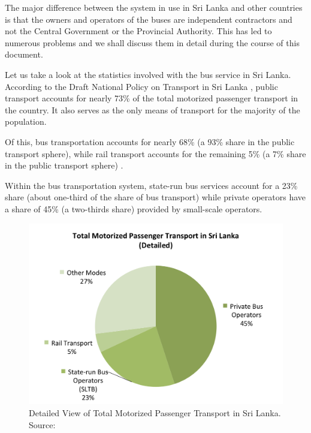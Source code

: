 \documentclass[12pt, oneside]{report}
\begin{document}
The major difference between the system in use in Sri Lanka and other countries is that the owners and operators of the buses are independent contractors and not the Central Government or the Provincial Authority. This has led to numerous problems and we shall discuss them in detail during the course of this document.

Let us take a look at the statistics involved with the bus service in Sri Lanka. According to the Draft National Policy on Transport in Sri Lanka \citep{MinistryofTransport2008}, public transport accounts for nearly 73\% of the total motorized passenger transport in the country. It also serves as the only means of transport for the majority of the population.

Of this, bus transportation accounts for nearly 68\% (a 93\% share in the public transport sphere), while rail transport accounts for the remaining 5\% (a 7\% share in the public transport sphere) \citep{MinistryofTransport2008}.

Within the bus transportation system, state-run bus services account for a 23\% share (about one-third of the share of bus transport) while private operators have a share of 45\% (a two-thirds share) provided by small-scale operators.

\begin {figure} [h!]
\centering
\includegraphics [scale=0.7] {totalMotorTransportPieChart}
\caption [Total Motorized Passenger Transport in SL] {Detailed View of Total Motorized Passenger Transport in Sri Lanka. Source: \citep{MinistryofTransport2008}}
\label {image-totalMotorTransportPieChart}
\end {figure}
\end{document}
